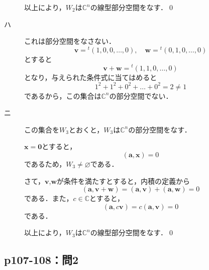 \documentclass[uplatex,dvipdfmx,a4paper,11pt,fleqn]{jsarticle}
\begin{document}
\begin{leftbar}
\begin{description}
        以上により，$W_2$は$\mathbb{C}^n$の線型部分空間をなす．\qed
        \item [ハ] これは部分空間をなさない．
        \[
            \bm{v}= {}^t (1,0,0,\ldots , 0),\quad \bm{w}={}^t (0,1,0,\ldots ,0) 
        \]
            とすると
            \[
                \bm{v} + \bm{w}={}^t (1,1,0,\ldots,0)
            \]
        となり，与えられた条件式に当てはめると
        \[
            1^2+1^2+0^2 +\dots + 0^2 =2 \ne 1
        \]
        であるから，この集合は$\mathbb{C}^n$の部分空間でない．
        \item [ニ] この集合を$W_3$とおくと，$W_3$は$\mathbb{C}^n$の部分空間をなす．
        
        $\bm{x}=\bm{0}$とすると，
        \[
        (\bm{a},\bm{x}) =0
        \] 
        であるため，$W_3 \ne \varnothing$である．

        さて，$\bm{v}$,$\bm{w}$が条件を満たすとすると，内積の定義から
        \[
        (\bm{a},\bm{v}+\bm{w})=(\bm{a},\bm{v})+(\bm{a},\bm{w})=0
        \]
        である．また，$ c \in \mathbb{C}$とすると，
        \[
        (\bm{a},c\bm{v})=c(\bm{a},\bm{v})=0
        \]
        である．

        以上により，$W_3$は$\mathbb{C}^n$の線型部分空間をなす．\qed
    \end{description}
\end{leftbar}


\subsection*{p107-108：問2}
\end{document}
